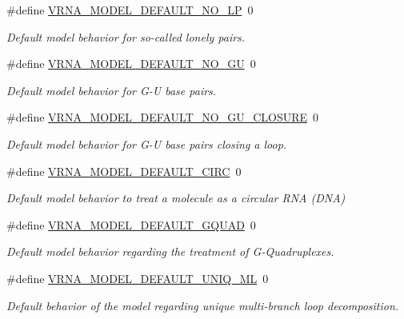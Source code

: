 \begin{DoxyCompactItemize}
\#define \mbox{\hyperlink{group__model__details_gab72462726dd60ed0d43339bbf7ee08ad}{V\+R\+N\+A\+\_\+\+M\+O\+D\+E\+L\+\_\+\+D\+E\+F\+A\+U\+L\+T\+\_\+\+N\+O\+\_\+\+LP}}~0
\begin{DoxyCompactList}\small\item\em Default model behavior for so-\/called \textquotesingle{}lonely pairs\textquotesingle{}. \end{DoxyCompactList}\item 
\#define \mbox{\hyperlink{group__model__details_ga34702f7d14d38b877ba8e475281e97e2}{V\+R\+N\+A\+\_\+\+M\+O\+D\+E\+L\+\_\+\+D\+E\+F\+A\+U\+L\+T\+\_\+\+N\+O\+\_\+\+GU}}~0
\begin{DoxyCompactList}\small\item\em Default model behavior for G-\/U base pairs. \end{DoxyCompactList}\item 
\#define \mbox{\hyperlink{group__model__details_ga5308de46faaca4b9fd16045864901ee7}{V\+R\+N\+A\+\_\+\+M\+O\+D\+E\+L\+\_\+\+D\+E\+F\+A\+U\+L\+T\+\_\+\+N\+O\+\_\+\+G\+U\+\_\+\+C\+L\+O\+S\+U\+RE}}~0
\begin{DoxyCompactList}\small\item\em Default model behavior for G-\/U base pairs closing a loop. \end{DoxyCompactList}\item 
\#define \mbox{\hyperlink{group__model__details_ga22059033db7bcd875c51fec32425490a}{V\+R\+N\+A\+\_\+\+M\+O\+D\+E\+L\+\_\+\+D\+E\+F\+A\+U\+L\+T\+\_\+\+C\+I\+RC}}~0
\begin{DoxyCompactList}\small\item\em Default model behavior to treat a molecule as a circular R\+NA (D\+NA) \end{DoxyCompactList}\item 
\#define \mbox{\hyperlink{group__model__details_ga793ed812e86f43799b14b2deee917f23}{V\+R\+N\+A\+\_\+\+M\+O\+D\+E\+L\+\_\+\+D\+E\+F\+A\+U\+L\+T\+\_\+\+G\+Q\+U\+AD}}~0
\begin{DoxyCompactList}\small\item\em Default model behavior regarding the treatment of G-\/\+Quadruplexes. \end{DoxyCompactList}\item 
\#define \mbox{\hyperlink{group__model__details_ga63f6006a02ba2d89148441f406c309e7}{V\+R\+N\+A\+\_\+\+M\+O\+D\+E\+L\+\_\+\+D\+E\+F\+A\+U\+L\+T\+\_\+\+U\+N\+I\+Q\+\_\+\+ML}}~0
\begin{DoxyCompactList}\small\item\em Default behavior of the model regarding unique multi-\/branch loop decomposition. \end{DoxyCompactList}\item 

\end{DoxyCompactItemize}
